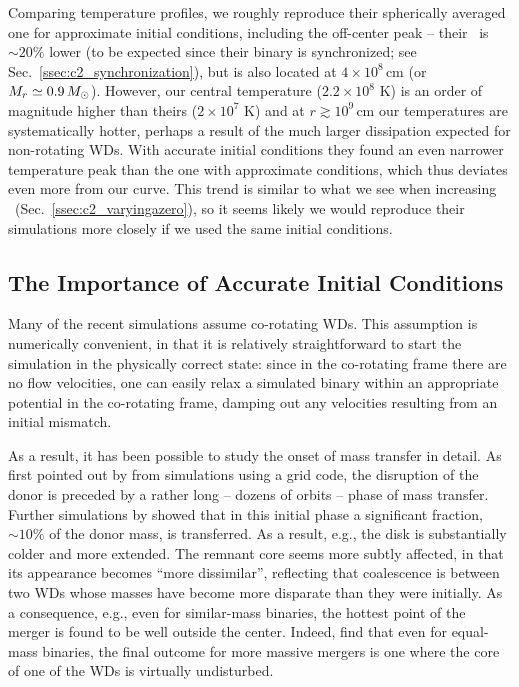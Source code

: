Comparing temperature profiles, we roughly reproduce their spherically averaged one for approximate initial conditions, including the off-center peak -- their \Tmax\ is $\sim\!20\%$ lower (to be expected since their binary is synchronized; see Sec.~\ref{ssec:c2_synchronization}), but is also located at $4\times10^8\,$cm (or $M_r\simeq0.9\,\Msun$).  However, our central temperature ($2.2\times10^8$ K) is an order of magnitude higher than theirs ($2\times10^7$ K) and at $r\gtrsim10^9\,$cm our temperatures are systematically hotter, perhaps a result of the much larger dissipation expected for non-rotating WDs.  With accurate initial conditions they found an even narrower temperature peak than the one with approximate conditions, which thus deviates even more from our curve.  This trend is similar to what we see when increasing \azero\ (Sec.~\ref{ssec:c2_varyingazero}), so it seems likely we would reproduce their simulations more closely if we used the same initial conditions.

\subsection{The Importance of Accurate Initial Conditions}
\label{ssec:c2_importance_accurate_ics}

Many of the recent simulations \citep{dan+11,dan+12,rask+12} assume co-rotating WDs.  This assumption is numerically convenient, in that it is relatively straightforward to start the simulation in the physically correct state: since in the co-rotating frame there are no flow velocities, one can easily relax a simulated binary within an appropriate potential in the co-rotating frame, damping out any velocities resulting from an initial mismatch.  

As a result, it has been possible to study the onset of mass transfer in detail.  As first pointed out by \citet{dsou+06} from simulations using a grid code, the disruption of the donor is preceded by a rather long -- dozens of orbits -- phase of mass transfer.  Further simulations by \cite{dan+11,dan+12} showed that in this initial phase a significant fraction, $\sim10\%$ of the donor mass, is transferred.  As a result, e.g., the disk is substantially colder and more extended.  The remnant core seems more subtly affected, in that its appearance becomes ``more dissimilar'', reflecting that coalescence is between two WDs whose masses have become more disparate than they were initially.  As a consequence, e.g., even for similar-mass binaries, the hottest point of the merger is found to be well outside the center.  Indeed, \citet{rask+12} find that even for equal-mass binaries, the final outcome for more massive mergers is one where the core of one of the WDs is virtually undisturbed.

